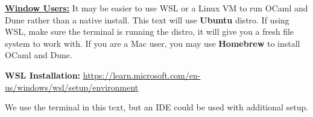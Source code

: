 \begin{Note}
	\underline{\textbf{Window Users:}} It may be easier to use WSL or a Linux VM to run OCaml and Dune rather than a native install.
	This text will use \textbf{Ubuntu} distro. If using WSL, make sure the terminal is running the distro, it will give you a fresh
	file system to work with. If you are a Mac user, you may use \textbf{Homebrew} to install OCaml and Dune.

	\noindent
	\textbf{WSL Installation:} \href{https://learn.microsoft.com/en-us/windows/wsl/setup/environment}{https://learn.microsoft.com/en-us/windows/wsl/setup/environment}
\end{Note}

\newpage

\noindent
We use the terminal in this text, but an IDE could be used with additional setup.

